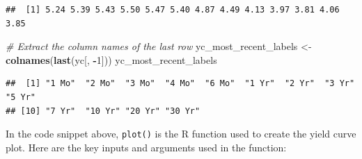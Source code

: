 \documentclass[
]{book}
\newenvironment{Shaded}{\begin{snugshade}}{\end{snugshade}}
\newcommand{\AttributeTok}[1]{\textcolor[rgb]{0.13,0.29,0.53}{#1}}
\newcommand{\CommentTok}[1]{\textcolor[rgb]{0.56,0.35,0.01}{\textit{#1}}}
\newcommand{\DecValTok}[1]{\textcolor[rgb]{0.00,0.00,0.81}{#1}}
\newcommand{\FunctionTok}[1]{\textcolor[rgb]{0.13,0.29,0.53}{\textbf{#1}}}
\newcommand{\NormalTok}[1]{#1}
\newcommand{\OtherTok}[1]{\textcolor[rgb]{0.56,0.35,0.01}{#1}}
\newcommand{\SpecialCharTok}[1]{\textcolor[rgb]{0.81,0.36,0.00}{\textbf{#1}}}
\newcommand{\StringTok}[1]{\textcolor[rgb]{0.31,0.60,0.02}{#1}}
\begin{document}
\begin{verbatim}
##  [1] 5.24 5.39 5.43 5.50 5.47 5.40 4.87 4.49 4.13 3.97 3.81 4.06 3.85
\end{verbatim}

\begin{Shaded}
\begin{Highlighting}[]
\CommentTok{\# Extract the column names of the last row}
\NormalTok{yc\_most\_recent\_labels }\OtherTok{\textless{}{-}} \FunctionTok{colnames}\NormalTok{(}\FunctionTok{last}\NormalTok{(yc[, }\SpecialCharTok{{-}}\DecValTok{1}\NormalTok{]))}
\NormalTok{yc\_most\_recent\_labels}
\end{Highlighting}
\end{Shaded}

\begin{verbatim}
##  [1] "1 Mo"  "2 Mo"  "3 Mo"  "4 Mo"  "6 Mo"  "1 Yr"  "2 Yr"  "3 Yr"  "5 Yr" 
## [10] "7 Yr"  "10 Yr" "20 Yr" "30 Yr"
\end{verbatim}

\begin{Shaded}
\end{Shaded}

In the code snippet above, \texttt{plot()} is the R function used to create the yield curve plot. Here are the key inputs and arguments used in the function:
\end{document}
